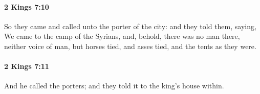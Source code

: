 		\paragraph{2 Kings 7:10} %
			\label{2KINGS-7-10}

			So they came and called unto the porter of the city: and they told them, saying, We came to the camp of the Syrians, and, behold, there was no man there, neither voice of man, but horses tied, and asses tied, and the tents as they were.


		\paragraph{2 Kings 7:11} %
			\label{2KINGS-7-11}

			And he called the porters; and they told it to the king’s house within.


